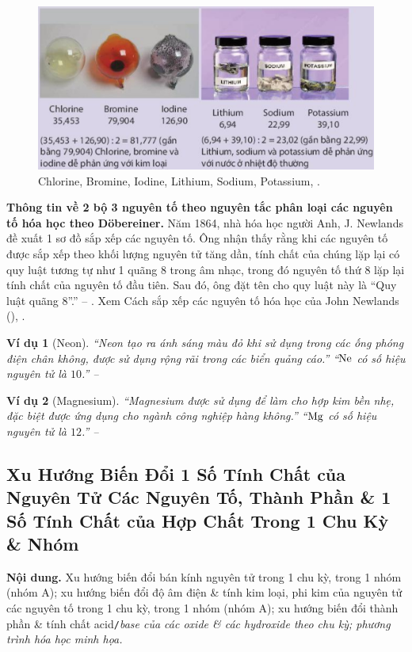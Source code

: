 \documentclass{article}
\numberwithin{equation}{section}
\newtheorem{vidu}{Ví dụ}[section]
\begin{document}
\begin{figure}[h]
	\centering
	\includegraphics[scale=0.15]{chlorine_bromine_iodine_lithium_sodium_potassium}
	\caption{Chlorine, Bromine, Iodine, Lithium, Sodium, Potassium, \cite[p. 41]{SGK_Hoa_Hoc_10_Chan_Troi_Sang_Tao}.}
\end{figure}
\textbf{Thông tin về 2 bộ 3 nguyên tố theo nguyên tắc phân loại các nguyên tố hóa học theo D\"obereiner.} Năm 1864, nhà hóa học người Anh, J. Newlands đề xuất 1 sơ đồ sắp xếp các nguyên tố. Ông nhận thấy rằng khi các nguyên tố được sắp xếp theo khối lượng nguyên tử tăng dần, tính chất của chúng lặp lại có quy luật tương tự như 1 quãng 8 trong âm nhạc, trong đó nguyên tố thứ 8 lặp lại tính chất của nguyên tố đầu tiên. Sau đó, ông đặt tên cho quy luật này là ``Quy luật quãng 8''.'' -- \cite[p. 41]{SGK_Hoa_Hoc_10_Chan_Troi_Sang_Tao}. Xem \textsf{Cách sắp xếp các nguyên tố hóa học của John Newlands} (\cite{Buthelezi_Dingrando_Hainen_Wistrom_Zike2013}), \cite[p. 41]{SGK_Hoa_Hoc_10_Chan_Troi_Sang_Tao}.

\begin{vidu}[Neon]
	``Neon tạo ra ánh sáng màu đỏ khi sử dụng trong các ống phóng điện chân không, được sử dụng rộng rãi trong các biển quảng cáo.'' ``$\rm Ne$ có số hiệu nguyên tử là $10$.'' -- \cite[p. 42]{SGK_Hoa_Hoc_10_Chan_Troi_Sang_Tao}
\end{vidu}

\begin{vidu}[Magnesium]
	``\emph{Magnesium} được sử dụng để làm cho hợp kim bền nhẹ, đặc biệt được ứng dụng cho ngành công nghiệp hàng không.'' ``$\rm Mg$ có số hiệu nguyên tử là $12$.'' -- \cite[p. 42]{SGK_Hoa_Hoc_10_Chan_Troi_Sang_Tao}
\end{vidu}


\subsection{Xu Hướng Biến Đổi 1 Số Tính Chất của Nguyên Tử Các Nguyên Tố, Thành Phần \& 1 Số Tính Chất của Hợp Chất Trong 1 Chu Kỳ \& Nhóm}
\textsf{\textbf{Nội dung.} Xu hướng biến đổi bán kính nguyên tử trong 1 chu kỳ, trong 1 nhóm (nhóm A); xu hướng biến đổi độ âm điện \& tính kim loại, phi kim của nguyên tử các nguyên tố trong 1 chu kỳ, trong 1 nhóm (nhóm A); xu hướng biến đổi thành phần \& tính chất acid}\texttt{/}\textit{base của các oxide \& các hydroxide theo chu kỳ; phương trình hóa học minh họa.}
\end{document}
